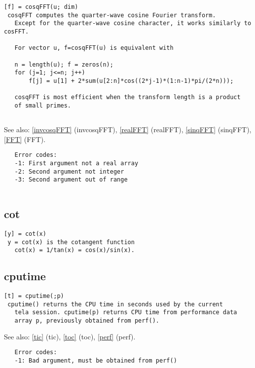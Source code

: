 \documentclass[a4paper]{article}
\begin{document}
\begin{tscreen}
\begin{verbatim}
[f] = cosqFFT(u; dim)
 cosqFFT computes the quarter-wave cosine Fourier transform.
   Except for the quarter-wave cosine character, it works similarly to cosFFT.
   
   For vector u, f=cosqFFT(u) is equivalent with

   n = length(u); f = zeros(n);
   for (j=1; j<=n; j++)
       f[j] = u[1] + 2*sum(u[2:n]*cos((2*j-1)*(1:n-1)*pi/(2*n)));
   
   cosqFFT is most efficient when the transform length is a product
   of small primes.
           
\end{verbatim}

See also: \ref{invcosqFFT} {(invcosqFFT)}, \ref{realFFT} {(realFFT)}, \ref{sinqFFT} {(sinqFFT)}, \ref{FFT} {(FFT)}.
\begin{verbatim}
   Error codes:
   -1: First argument not a real array
   -2: Second argument not integer
   -3: Second argument out of range
   
\end{verbatim}
\end{tscreen}





\subsection{cot\label{cot}}

\begin{tscreen}
\begin{verbatim}
[y] = cot(x)
 y = cot(x) is the cotangent function
   cot(x) = 1/tan(x) = cos(x)/sin(x). 
\end{verbatim}
\end{tscreen}





\subsection{cputime\label{cputime}}

\begin{tscreen}
\begin{verbatim}
[t] = cputime(;p)
 cputime() returns the CPU time in seconds used by the current
   tela session. cputime(p) returns CPU time from performance data
   array p, previously obtained from perf().
\end{verbatim}

See also: \ref{tic} {(tic)}, \ref{toc} {(toc)}, \ref{perf} {(perf)}.
\begin{verbatim}
   Error codes:
   -1: Bad argument, must be obtained from perf() 
\end{verbatim}
\end{tscreen}
\end{document}
